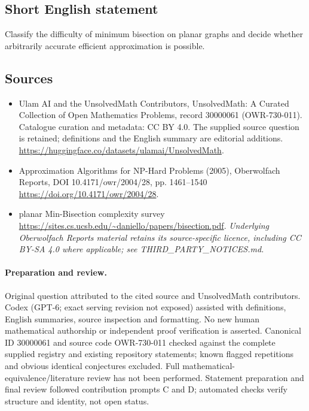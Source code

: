 \documentclass[11pt]{article}
\begin{document}
\subsection{Short English statement}
Classify the difficulty of minimum bisection on planar graphs and decide whether arbitrarily accurate efficient approximation is possible.
\subsection{Sources}
\begin{itemize}
\item[\hypertarget{source:30000061:1}{S1}] Ulam AI and the UnsolvedMath Contributors, UnsolvedMath: A Curated Collection of Open Mathematics Problems, record 30000061 (OWR-730-011). Catalogue curation and metadata: CC BY 4.0. The supplied source question is retained; definitions and the English summary are editorial additions.
\url{https://huggingface.co/datasets/ulamai/UnsolvedMath}.
\item[\hypertarget{source:30000061:2}{S2}] Approximation Algorithms for NP-Hard Problems (2005), Oberwolfach Reports, DOI 10.4171/owr/2004/28, pp. 1461--1540
\url{https://doi.org/10.4171/owr/2004/28}.
\item[\hypertarget{source:30000061:3}{S3}] planar Min-Bisection complexity survey
\url{https://sites.cs.ucsb.edu/~daniello/papers/bisection.pdf}.
\textit{Underlying Oberwolfach Reports material retains its source-specific licence, including CC BY-SA 4.0 where applicable; see THIRD\_PARTY\_NOTICES.md.}
\end{itemize}
\paragraph{Preparation and review.}
Original question attributed to the cited source and UnsolvedMath contributors. Codex (GPT-6; exact serving revision not exposed) assisted with definitions, English summaries, source inspection and formatting. No new human mathematical authorship or independent proof verification is asserted. Canonical ID 30000061 and source code OWR-730-011 checked against the complete supplied registry and existing repository statements; known flagged repetitions and obvious identical conjectures excluded. Full mathematical-equivalence/literature review has not been performed. Statement preparation and final review followed contribution prompts C and D; automated checks verify structure and identity, not open status.
\label{end:30000061}
\end{document}
